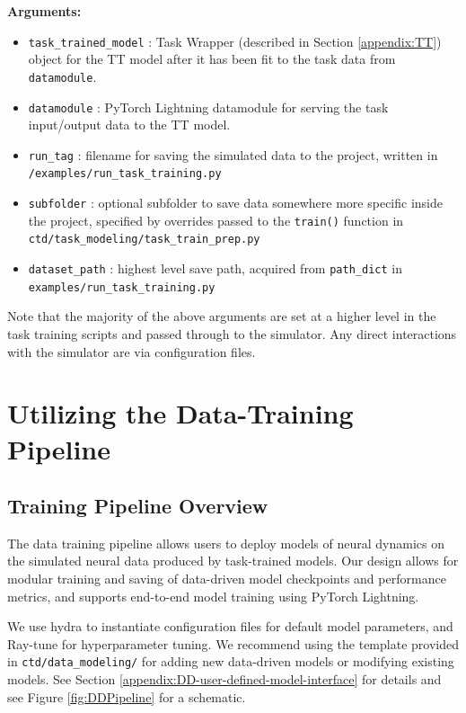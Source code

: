 \documentclass{article}
\begin{document}
\vspace{-0.2cm}
\textbf{Arguments:}
\begin{itemize}
    \item  \texttt{task\_trained\_model} : Task Wrapper (described in Section \ref{appendix:TT}) object for the TT model after it has been fit to the task data from \texttt{datamodule}.
    \item \texttt{datamodule} : PyTorch Lightning datamodule for serving the task input/output data to the TT model.
    \item \texttt{run\_tag} : filename for saving the simulated data to the project, written in \texttt{/examples/run\_task\_training.py}
    \item \texttt{subfolder} : optional subfolder to save data somewhere more specific inside the project, specified by overrides passed to the \texttt{train()} function in \texttt{ctd/task\_modeling/task\_train\_prep.py}
    \item \texttt{dataset\_path} : highest level save path, acquired from \texttt{path\_dict} in \texttt{examples/run\_task\_training.py}
\end{itemize}

Note that the majority of the above arguments are set at a higher level in the task training scripts and passed through to the simulator. Any direct interactions with the simulator are via configuration files.

\clearpage

\section{Utilizing the Data-Training Pipeline \label{appendix:DD}}

\subsection{Training Pipeline Overview \label{appendix:DD-training-overview}}
The data training pipeline allows users to deploy models of neural dynamics on the simulated neural data produced by task-trained models. Our design allows for modular training and saving of data-driven model checkpoints and performance metrics, and supports end-to-end model training using PyTorch Lightning.

 We use hydra \cite{Yadan2019Hydra} to instantiate configuration files for default model parameters, and Ray-tune \cite{liaw_tune_2018} for hyperparameter tuning. We recommend using the template provided in \texttt{ctd/data\_modeling/} for adding new data-driven models or modifying existing models. See Section \ref{appendix:DD-user-defined-model-interface} for details and see Figure \ref{fig:DDPipeline} for a schematic.
\end{document}
